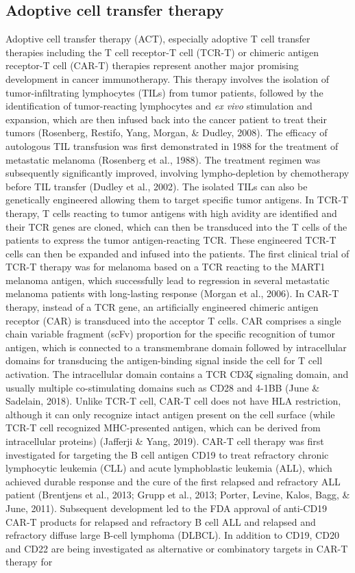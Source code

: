 \documentclass[12pt,twoside,openany,\mydriver]{thesis}  %
\begin{document}
\hypertarget{intro-act}{%
\subsection{Adoptive cell transfer therapy}\label{intro-act}}

Adoptive cell transfer therapy (ACT), especially adoptive T cell transfer therapies including the T cell receptor-T cell (TCR-T) or chimeric antigen receptor-T cell (CAR-T) therapies represent another major promising development in cancer immunotherapy. This therapy involves the isolation of tumor-infiltrating lymphocytes (TILs) from tumor patients, followed by the identification of tumor-reacting lymphocytes and \emph{ex vivo} stimulation and expansion, which are then infused back into the cancer patient to treat their tumors (Rosenberg, Restifo, Yang, Morgan, \& Dudley, 2008). The efficacy of autologous TIL transfusion was first demonstrated in 1988 for the treatment of metastatic melanoma (Rosenberg et al., 1988). The treatment regimen was subsequently significantly improved, involving lympho-depletion by chemotherapy before TIL transfer (Dudley et al., 2002). The isolated TILs can also be genetically engineered allowing them to target specific tumor antigens. In TCR-T therapy, T cells reacting to tumor antigens with high avidity are identified and their TCR genes are cloned, which can then be transduced into the T cells of the patients to express the tumor antigen-reacting TCR. These engineered TCR-T cells can then be expanded and infused into the patients. The first clinical trial of TCR-T therapy was for melanoma based on a TCR reacting to the MART1 melanoma antigen, which successfully lead to regression in several metastatic melanoma patients with long-lasting response (Morgan et al., 2006). In CAR-T therapy, instead of a TCR gene, an artificially engineered chimeric antigen receptor (CAR) is transduced into the acceptor T cells. CAR comprises a single chain variable fragment (scFv) proportion for the specific recognition of tumor antigen, which is connected to a transmembrane domain followed by intracellular domains for transducing the antigen-binding signal inside the cell for T cell activation. The intracellular domain contains a TCR CD3ζ signaling domain, and usually multiple co-stimulating domains such as CD28 and 4-1BB (June \& Sadelain, 2018). Unlike TCR-T cell, CAR-T cell does not have HLA restriction, although it can only recognize intact antigen present on the cell surface (while TCR-T cell recognized MHC-presented antigen, which can be derived from intracellular proteins) (Jafferji \& Yang, 2019). CAR-T cell therapy was first investigated for targeting the B cell antigen CD19 to treat refractory chronic lymphocytic leukemia (CLL) and acute lymphoblastic leukemia (ALL), which achieved durable response and the cure of the first relapsed and refractory ALL patient (Brentjens et al., 2013; Grupp et al., 2013; Porter, Levine, Kalos, Bagg, \& June, 2011). Subsequent development led to the FDA approval of anti-CD19 CAR-T products for relapsed and refractory B cell ALL and relapsed and refractory diffuse large B-cell lymphoma (DLBCL). In addition to CD19, CD20 and CD22 are being investigated as alternative or combinatory targets in CAR-T therapy for 
\end{document}
